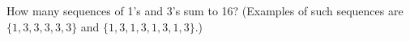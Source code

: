 How many sequences of 1's and 3's sum to 16? (Examples of such sequences are
$\{1, 3, 3, 3, 3, 3\}$ and $\{1, 3, 1, 3, 1, 3, 1, 3\}$.)
